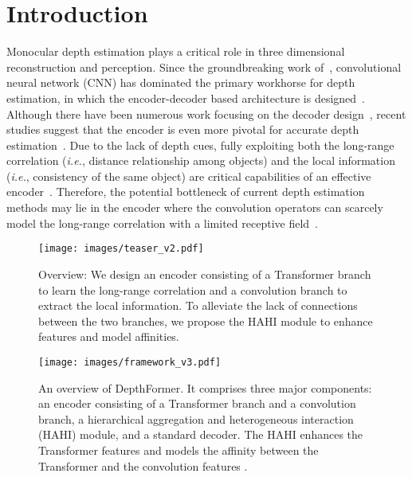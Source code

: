 \documentclass[twocolumn]{svjour3}    \pdfoutput=1
\begin{document}
\section{Introduction}
\label{sec:introduction}

Monocular depth estimation plays a critical role in three dimensional reconstruction and perception. Since the groundbreaking work of~\citep{he2016resenet}, convolutional neural network (CNN) has dominated the primary workhorse for depth estimation, in which the encoder-decoder based architecture is designed~\citep{fu2018deep, lee2019bts, bhat2021adabins}. Although there have been numerous work focusing on the decoder design~\citep{fu2018deep, bhat2021adabins}, recent studies suggest that the encoder is even more pivotal for accurate depth estimation~\citep{lee2019bts, ranftl2021dpt}. Due to the lack of depth cues, fully exploiting both the long-range correlation (\textit{i.e.}, distance relationship among objects) and the local information (\textit{i.e.}, consistency of the same object) are critical capabilities of an effective encoder~\citep{saxena2005learning}. Therefore, the potential bottleneck of current depth estimation methods may lie in the encoder where the convolution operators can scarcely model the long-range correlation with a limited receptive field~\citep{ranftl2021dpt}.

\begin{figure}
    \centering
    \texttt{[image: images/teaser\_v2.pdf]}
    \caption{Overview: We design an encoder consisting of a Transformer branch to learn the long-range correlation and a convolution branch to extract the local information. To alleviate the lack of connections between the two branches, we propose the HAHI module to enhance features and model affinities.}
    \label{fig:teaser}
\end{figure}

\begin{figure*}[t]
\centering
  \texttt{[image: images/framework\_v3.pdf]}
  \caption{An overview of DepthFormer. It comprises three major components: an encoder consisting of a Transformer branch and a convolution branch, a hierarchical aggregation and heterogeneous interaction (HAHI) module, and a standard decoder. The HAHI enhances the Transformer features  and models the affinity between the Transformer and the convolution features .}
\label{fig:arch}
\end{figure*}
\end{document}
